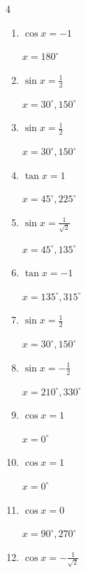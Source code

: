 \begin{multicols}{4}
\begin{enumerate}
        $\displaystyle x = 210^{\circ} , 330^{\circ}$

  \item $\displaystyle \cos{x}  = -1$

        $\displaystyle x = 180^{\circ}$

  \item $\displaystyle \sin{x}  = \frac{1}{2}$

        $\displaystyle x = 30^{\circ} , 150^{\circ}$

  \item $\displaystyle \sin{x}  = \frac{1}{2}$

        $\displaystyle x = 30^{\circ} , 150^{\circ}$

  \item $\displaystyle \tan{x}  = 1$

        $\displaystyle x = 45^{\circ} , 225^{\circ}$

\columnbreak %

  \item $\displaystyle \sin{x}  = \frac{1}{\sqrt{2}}$

        $\displaystyle x = 45^{\circ} , 135^{\circ}$

  \item $\displaystyle \tan{x}  = -1$

        $\displaystyle x = 135^{\circ} , 315^{\circ}$

  \item $\displaystyle \sin{x}  = \frac{1}{2}$

        $\displaystyle x = 30^{\circ} , 150^{\circ}$

  \item $\displaystyle \sin{x}  = -\frac{1}{2}$

        $\displaystyle x = 210^{\circ} , 330^{\circ}$

  \item $\displaystyle \cos{x}  = 1$

        $\displaystyle x = 0^{\circ}$

  \item $\displaystyle \cos{x}  = 1$

        $\displaystyle x = 0^{\circ}$

  \item $\displaystyle \cos{x}  = 0$

        $\displaystyle x = 90^{\circ} , 270^{\circ}$

  \item $\displaystyle \cos{x}  = -\frac{1}{\sqrt{2}}$


\end{enumerate}
\end{multicols}
